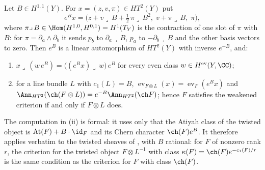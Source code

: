 \begin{lemma}\label{lem:bfield}
Let $B\in H^{1,1}(Y)$. For $x=(z,v,\pi)\in HT^{2}(Y)$ put
\begin{equation}\label{eq:bfield}
  e^{B}x=\bigl(z+v\lrcorner\,B+\tfrac12\,\pi\lrcorner\,B^{2},\;
  v+\pi\lrcorner\,B,\;\pi\bigr),
\end{equation}
where $\pi\lrcorner\,B\in\Hom(H^{1,0},H^{0,1})=H^{1}(T_{Y})$ is the contraction
of one slot of $\pi$ with $B$: for $\pi=\partial_{a}\wedge\partial_{b}$ it sends
$p_{b}$ to $\partial_{a}\lrcorner\,B$, $p_{a}$ to $-\partial_{b}\lrcorner\,B$
and the other basis vectors to zero. Then $e^{B}$ is a linear automorphism of
$HT^{2}(Y)$ with inverse $e^{-B}$, and:
\begin{enumerate}[label=\textup{(\roman*)},nosep]
\item $x\lrcorner\,(w\,e^{B})=\bigl((e^{B}x)\lrcorner\,w\bigr)\,e^{B}$ for
  every even class $w\in H^{\mathrm{ev}}(Y,\CC)$;
\item for a line bundle $L$ with $c_{1}(L)=B$,
  $\operatorname{ev}_{F\otimes L}(x)=\operatorname{ev}_{F}(e^{B}x)$ and
  $\Ann_{HT^{2}}(\ch(F\otimes L))=e^{-B}\Ann_{HT^{2}}(\ch F)$; hence $F$
  satisfies the weakened criterion if and only if $F\otimes L$ does.
\end{enumerate}
The computation in (ii) is formal: it uses only that the Atiyah class of the
twisted object is $\mathrm{At}(F)+B\cdot\id_{F}$ and its Chern character
$\ch(F)e^{B}$. It therefore applies verbatim to the twisted sheaves of
\cite[Section 2]{Mar25b}, with $B$ rational: for $F$ of nonzero rank $r$, the
criterion for the twisted object $F\otimes L^{-1}$ with class
$\kappa(F)=\ch(F)e^{-c_{1}(F)/r}$ is the same condition as the criterion for
$F$ with class $\ch(F)$.
\end{lemma}

